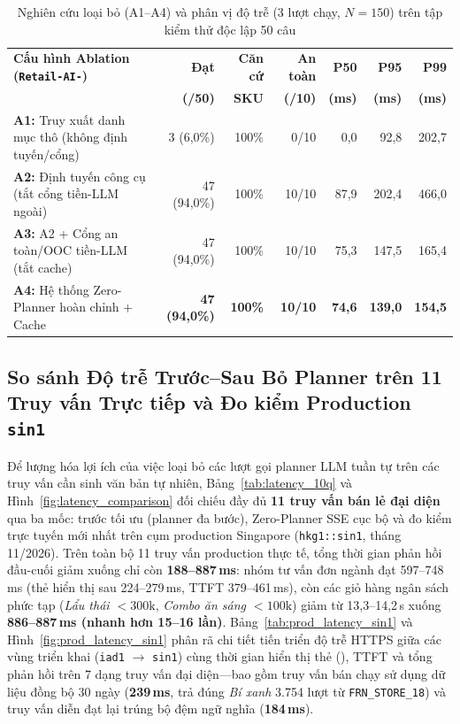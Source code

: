 \begin{table}[H]
\centering
\caption{Nghiên cứu loại bỏ (A1--A4) và phân vị độ trễ (3 lượt chạy, $N=150$) trên tập kiểm thử độc lập 50 câu}
\label{tab:retail_ablation_50q}
\footnotesize
\setlength{\tabcolsep}{3.8pt}
\begin{tabularx}{\textwidth}{Y r r r r r r}
\toprule
\textbf{Cấu hình Ablation (\texttt{Retail-AI-})} & \textbf{Đạt} & \textbf{Căn cứ} & \textbf{An toàn} & \textbf{P50} & \textbf{P95} & \textbf{P99} \\
 & \textbf{(/50)} & \textbf{SKU} & \textbf{(/10)} & \textbf{(ms)} & \textbf{(ms)} & \textbf{(ms)} \\
\midrule
\textbf{A1:} Truy xuất danh mục thô (không định tuyến/cổng) & 3 (6,0\%) & 100\% & 0/10 & 0,0 & 92,8 & 202,7 \\
\textbf{A2:} Định tuyến công cụ (tắt cổng tiền-LLM ngoài) & 47 (94,0\%) & 100\% & 10/10 & 87,9 & 202,4 & 466,0 \\
\textbf{A3:} A2 + Cổng an toàn/OOC tiền-LLM (tắt cache) & 47 (94,0\%) & 100\% & 10/10 & 75,3 & 147,5 & 165,4 \\
\textbf{A4:} Hệ thống Zero-Planner hoàn chỉnh + Cache & \textbf{47 (94,0\%)} & \textbf{100\%} & \textbf{10/10} & \textbf{74,6} & \textbf{139,0} & \textbf{154,5} \\
\bottomrule
\end{tabularx}
\end{table}

\subsection*{So sánh Độ trễ Trước--Sau Bỏ Planner trên 11 Truy vấn Trực tiếp và Đo kiểm Production \texttt{sin1}}
Để lượng hóa lợi ích của việc loại bỏ các lượt gọi planner LLM tuần tự trên các truy vấn cần sinh văn bản tự nhiên, Bảng~\ref{tab:latency_10q} và Hình~\ref{fig:latency_comparison} đối chiếu đầy đủ \textbf{11 truy vấn bán lẻ đại diện} qua ba mốc: trước tối ưu (planner đa bước), Zero-Planner SSE cục bộ và đo kiểm trực tuyến mới nhất trên cụm production Singapore (\texttt{hkg1::sin1}, tháng 11/2026). Trên toàn bộ 11 truy vấn production thực tế, tổng thời gian phản hồi đầu-cuối giảm xuống chỉ còn \textbf{188--887\,ms}: nhóm tư vấn đơn ngành đạt 597--748\,ms (thẻ hiển thị sau 224--279\,ms, TTFT 379--461\,ms), còn các giỏ hàng ngân sách phức tạp (\emph{Lẩu thái $<300\text{k}$}, \emph{Combo ăn sáng $<100\text{k}$}) giảm từ 13,3--14,2\,s xuống \textbf{886--887\,ms (nhanh hơn 15--16 lần)}. Bảng~\ref{tab:prod_latency_sin1} và Hình~\ref{fig:prod_latency_sin1} phân rã chi tiết tiến triển độ trễ HTTPS giữa các vùng triển khai (\texttt{iad1} $\to$ \texttt{sin1}) cùng thời gian hiển thị thẻ (), TTFT và tổng phản hồi trên 7 dạng truy vấn đại diện---bao gồm truy vấn bán chạy sử dụng dữ liệu đồng bộ 30 ngày (\textbf{239\,ms}, trả đúng \emph{Bí xanh} 3.754 lượt từ \texttt{FRN\_STORE\_18}) và truy vấn diễn đạt lại trúng bộ đệm ngữ nghĩa (\textbf{184\,ms}).

